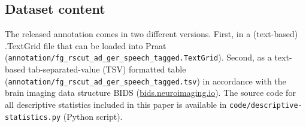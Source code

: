 \documentclass[10pt,a4paper,twocolumn]{article}
\begin{document}
\subsection*{Dataset content}
The released annotation comes in two different versions. First, in a (text-based) .TextGrid file that can be loaded into Praat (\texttt{annotation/fg\_rscut\_ad\_ger\_speech\_tagged.TextGrid}).
Second, as a text-based tab-separated-value (TSV) formatted table  (\texttt{annotation/fg\_rscut\_ad\_ger\_speech\_tagged.tsv})  in accordance with the brain imaging data structure BIDS \citep{gorgolewski2016bids} (\href{https://bids.neuroimaging.io/}{bids.neuroimaging.io}). The source code for all descriptive statistics included in this paper is available in \texttt{code/descriptive-statistics.py} (Python script).
\end{document}
